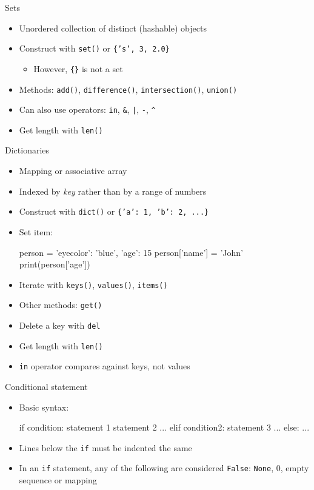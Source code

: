 \documentclass[noamssymb,svgnames]{beamer}
\newcommand{\obj}[1]{\texttt{\color{darkblue}#1}}
\begin{document}
\begin{frame}[fragile]{Sets}
  \begin{itemize}
  \item Unordered collection of distinct (hashable) objects
  \item Construct with \obj{set()} or \obj{\{'s', 3, 2.0\}}
    \begin{itemize}
    \item However, \obj{\{\}} is not a set
    \end{itemize}
  \item Methods: \obj{add()}, \obj{difference()}, \obj{intersection()},
    \obj{union()}
  \item Can also use operators: \obj{in}, \obj{\&}, \obj{|}, \obj{-}, \obj{\^}
  \item Get length with \obj{len()}
  \end{itemize}
\end{frame}

\begin{frame}[fragile]{Dictionaries}
  \begin{itemize}
  \item Mapping or associative array
  \item Indexed by \emph{key} rather than by a range of numbers
  \item Construct with \obj{dict()} or \obj{\{'a': 1, 'b': 2, ...\}}
  \item Set item:
    \begin{python}
      person = {'eyecolor': 'blue', 'age': 15}
      person['name'] = 'John'
      print(person['age'])
    \end{python}
  \item Iterate with \obj{keys()}, \obj{values()}, \obj{items()}
  \item Other methods: \obj{get()}
  \item Delete a key with \obj{del}
  \item Get length with \obj{len()}
  \item \obj{in} operator compares against keys, not values
  \end{itemize}
\end{frame}

\begin{frame}[fragile]{Conditional statement}
  \begin{itemize}
  \item Basic syntax:
    \begin{python}
        if condition:
            statement 1
            statement 2
            ...
        elif condition2:
            statement 3
            ...
        else:
            ...
    \end{python}
  \item Lines below the \obj{if} must be indented the same
  \item In an \obj{if} statement, any of the following are considered
    \obj{False}: \obj{None}, 0, empty sequence or mapping
  \end{itemize}
\end{frame}
\end{document}
